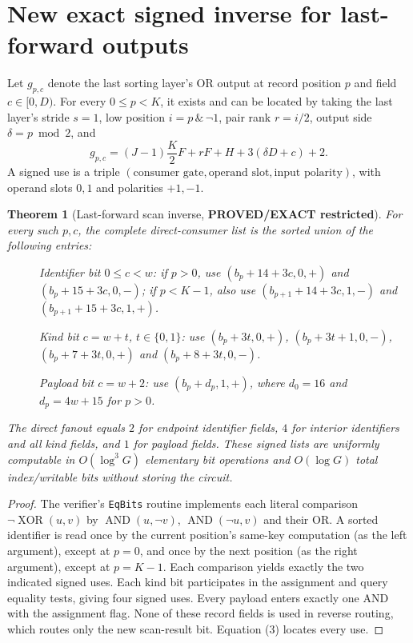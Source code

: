 \documentclass[11pt]{article}
\newtheorem{theorem}{Theorem}
\begin{document}
\section{New exact signed inverse for last-forward outputs}
Let $g_{p,c}$ denote the last sorting layer's OR output at
record position $p$ and field $c\in[0,D)$. For every
$0\le p<K$, it exists and can be located by taking the last
layer's stride $s=1$, low position $i=p\,\&\,\neg1$,
pair rank $r=i/2$, output side $\delta=p\bmod2$, and
\[
  g_{p,c}=\left(J-1\right)\frac K2F+rF+H+3(\delta D+c)+2.
                                                               \tag{5}
\]
A signed use is a triple $(\text{consumer gate},
\text{operand slot},\text{input polarity})$, with operand slots
$0,1$ and polarities $+1,-1$.
\begin{theorem}[Last-forward scan inverse, \textbf{PROVED/EXACT restricted}]
For every such $p,c$, the \emph{complete} direct-consumer
list is the sorted union of the following entries:
\begin{description}
\item[] \emph{Identifier bit} $0\le c<w$:
if $p>0$, use
$(b_p+14+3c,0,+)$ and $(b_p+15+3c,0,-)$; if
$p<K-1$, also use
$(b_{p+1}+14+3c,1,-)$ and
$(b_{p+1}+15+3c,1,+)$.
\item[] \emph{Kind bit} $c=w+t$, $t\in\{0,1\}$:
use $(b_p+3t,0,+)$, $(b_p+3t+1,0,-)$,
$(b_p+7+3t,0,+)$ and $(b_p+8+3t,0,-)$.
\item[] \emph{Payload bit} $c=w+2$:
use $(b_p+d_p,1,+)$, where
$d_0=16$ and $d_p=4w+15$ for $p>0$.
\end{description}
The direct fanout equals $2$ for endpoint identifier fields,
$4$ for interior identifiers and all kind fields, and $1$
for payload fields. These signed lists are uniformly computable
in $O(\log^3G)$ elementary bit operations and $O(\log G)$
total index/writable bits without storing the circuit.
\end{theorem}
\begin{proof}
The verifier's \texttt{EqBits} routine implements each literal
comparison $\neg\operatorname{XOR}(u,v)$ by
$\operatorname{AND}(u,\neg v)$,
$\operatorname{AND}(\neg u,v)$ and their OR.
A sorted identifier is read once by the current position's
same-key computation (as the left argument), except at $p=0$,
and once by the next position (as the right argument), except
at $p=K-1$. Each comparison yields exactly the two indicated
signed uses. Each kind bit participates in the assignment and
query equality tests, giving four signed uses. Every payload
enters exactly one AND with the assignment flag. None of these
record fields is used in reverse routing, which routes only the
new scan-result bit. Equation (3) locates every use.
\end{proof}
\end{document}

